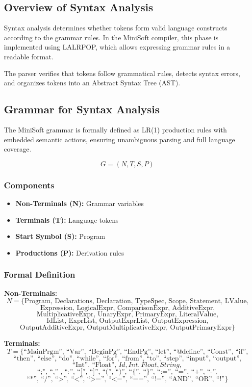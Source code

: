 \documentclass[12pt,a4paper]{article}
\begin{document}
\subsection{Overview of Syntax Analysis}
Syntax analysis determines whether tokens form valid language constructs according to the grammar rules. In the MiniSoft compiler, this phase is implemented using LALRPOP, which allows expressing grammar rules in a readable format.

The parser verifies that tokens follow grammatical rules, detects syntax errors, and organizes tokens into an Abstract Syntax Tree (AST).


\subsection{Grammar for Syntax Analysis}
The MiniSoft grammar is formally defined as LR(1) production rules with embedded semantic actions, ensuring unambiguous parsing and full language coverage.

\[
	G = (N, T, S, P)
\]

\subsubsection*{Components}
\begin{itemize}
	\item \textbf{Non-Terminals (N):} Grammar variables
	\item \textbf{Terminals (T):} Language tokens
	\item \textbf{Start Symbol (S):} Program
	\item \textbf{Productions (P):} Derivation rules
\end{itemize}

\subsubsection*{Formal Definition}

\noindent\textbf{Non-Terminals:}
\[
	N = \{
	\text{Program, Declarations, Declaration, TypeSpec, Scope, Statement, LValue,}
\]
\[
	\text{Expression, LogicalExpr, ComparisonExpr, AdditiveExpr,}
\]
\[
	\text{MultiplicativeExpr, UnaryExpr, PrimaryExpr, LiteralValue,}
\]
\[
	\text{IdList, ExprList, OutputExprList, OutputExpression,}
\]
\[
	\text{OutputAdditiveExpr, OutputMultiplicativeExpr, OutputPrimaryExpr}
	\}
\]

\noindent\textbf{Terminals:}
\[
	T = \{
	\text{``MainPrgm'', ``Var'', ``BeginPg'', ``EndPg'', ``let'', ``@define'', ``Const'', ``if'',}
\]
\[
	\text{``then'', ``else'', ``do'', ``while'', ``for'', ``from'', ``to'', ``step'', ``input'', ``output'',}
\]
\[
	\text{``Int'', ``Float'', } \mathit{Id}, \mathit{Int}, \mathit{Float}, \mathit{String},
\]
\[
	\text{``;'', ``,'' , ``:'', ``['', ``]'', ``('', ``)'', ``\{'', ``\}'', ``:='', ``='', ``+'', ``-'',}
\]
\[
	\text{``*'', ``/'', ``>'', ``<'', ``>='', ``<='', ``=='', ``!='', ``AND'', ``OR'', ``!''}
	\}
\]
\end{document}
